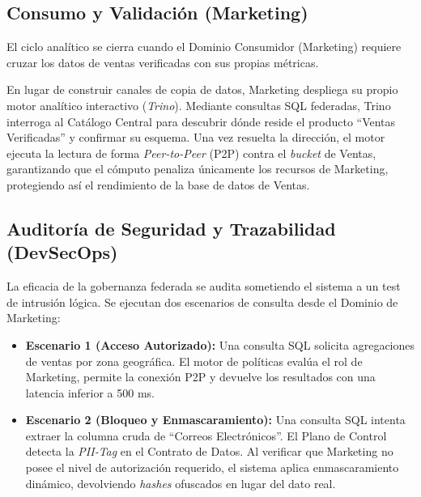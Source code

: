 \documentclass[12pt, a4paper]{article}
\begin{document}
\subsection{Consumo y Validación (Marketing)}

El ciclo analítico se cierra cuando el Dominio Consumidor (Marketing) requiere cruzar los datos de ventas verificadas con sus propias métricas. 

En lugar de construir canales de copia de datos, Marketing despliega su propio motor analítico interactivo (\textit{Trino}). Mediante consultas SQL federadas, Trino interroga al Catálogo Central para descubrir dónde reside el producto ``Ventas Verificadas'' y confirmar su esquema. Una vez resuelta la dirección, el motor ejecuta la lectura de forma \textit{Peer-to-Peer} (P2P) contra el \textit{bucket} de Ventas, garantizando que el cómputo penaliza únicamente los recursos de Marketing, protegiendo así el rendimiento de la base de datos de Ventas.

\subsection{Auditoría de Seguridad y Trazabilidad (DevSecOps)}

La eficacia de la gobernanza federada se audita sometiendo el sistema a un test de intrusión lógica. Se ejecutan dos escenarios de consulta desde el Dominio de Marketing:

\begin{itemize}
    \item \textbf{Escenario 1 (Acceso Autorizado):} Una consulta SQL solicita agregaciones de ventas por zona geográfica. El motor de políticas evalúa el rol de Marketing, permite la conexión P2P y devuelve los resultados con una latencia inferior a 500 ms.
    \item \textbf{Escenario 2 (Bloqueo y Enmascaramiento):} Una consulta SQL intenta extraer la columna cruda de ``Correos Electrónicos''. El Plano de Control detecta la \textit{PII-Tag} en el Contrato de Datos. Al verificar que Marketing no posee el nivel de autorización requerido, el sistema aplica enmascaramiento dinámico, devolviendo \textit{hashes} ofuscados en lugar del dato real.
\end{itemize}
\end{document}
